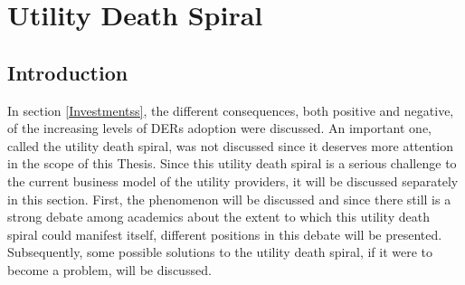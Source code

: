 \section{Utility Death Spiral} \label{spiral}
\subsection{Introduction}
In section \ref{Investmentss}, the different consequences, both positive and negative, of the increasing levels of DERs adoption were discussed. An important one, called the utility death spiral, was not discussed since it deserves more attention in the scope of this Thesis. Since this utility death spiral is a serious challenge to the current business model of the utility providers, it will be discussed separately in this section. First, the phenomenon will be discussed and since there still is a strong debate among academics about the extent to which this utility death spiral could manifest itself, different positions in this debate will be presented. Subsequently, some possible solutions to the utility death spiral, if it were to become a problem, will be discussed. 
